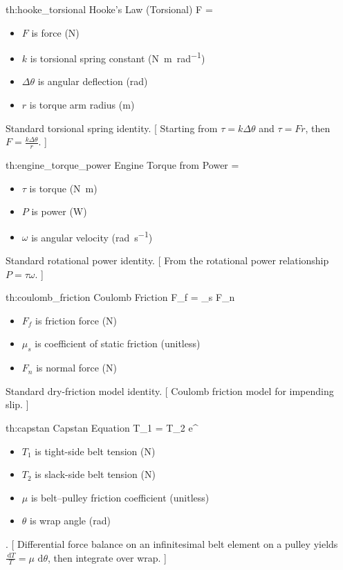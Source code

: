 \documentclass[11pt]{article}
\numberwithin{equation}{section}
\newcommand{\dd}{\,\mathrm{d}}
\newcounter{theory}
\begin{document}
\theory
{th:hooke_torsional}
{Hooke's Law (Torsional)}
{F = }
{
\begin{itemize}
  \item $F$ is force (\si{\newton})
  \item $k$ is torsional spring constant (\si{\newton\meter\per\radian})
  \item $\Delta \theta$ is angular deflection (\si{\radian})
  \item $r$ is torque arm radius (\si{\meter})
\end{itemize}
}
{Standard torsional spring identity.}
[
Starting from $\tau = k\Delta\theta$ and $\tau = Fr$, then $F = \frac{k\Delta\theta}{r}$.
]


\theory
{th:engine_torque_power}
{Engine Torque from Power}
{\tau = }
{
\begin{itemize}
  \item $\tau$ is torque (\si{\newton\meter})
  \item $P$ is power (\si{\watt})
  \item $\omega$ is angular velocity (\si{\radian\per\second})
\end{itemize}
}
{Standard rotational power identity.}
[
From the rotational power relationship $P=\tau\omega$.
]


\theory
{th:coulomb_friction}
{Coulomb Friction}
{F_f = \mu_s F_n}
{
\begin{itemize}
  \item $F_f$ is friction force (\si{\newton})
  \item $\mu_s$ is coefficient of static friction (unitless)
  \item $F_n$ is normal force (\si{\newton})
\end{itemize}
}
{Standard dry-friction model identity.}
[
Coulomb friction model for impending slip.
]

\theory
{th:capstan}
{Capstan Equation}
{T_1 = T_2 e^{\mu \theta}}
{
\begin{itemize}
  \item $T_1$ is tight-side belt tension (\si{\newton})
  \item $T_2$ is slack-side belt tension (\si{\newton})
  \item $\mu$ is belt--pulley friction coefficient (unitless)
  \item $\theta$ is wrap angle (\si{\radian})
\end{itemize}
}
{\citet{CapstanEquation2021}.}
[
Differential force balance on an infinitesimal belt element on a pulley yields $\frac{\dd T}{T}=\mu\,\dd\theta$, then integrate over wrap.
]
\end{document}

